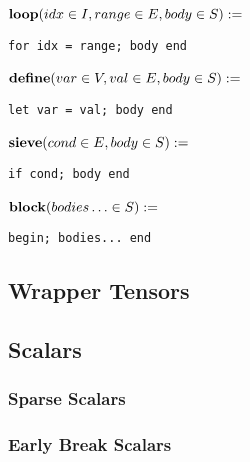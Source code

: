\noindent\begin{minipage}{.5\linewidth}
\raggedleft $\text{\textbf{loop}}(idx \in I, range \in E, body \in S) :=$~
\end{minipage}%
\begin{minipage}{.5\linewidth}
\begin{verbatim}
for idx = range; body end
\end{verbatim}
\end{minipage}

\noindent\begin{minipage}{.5\linewidth}
\raggedleft $\text{\textbf{define}}(var \in V, val \in E, body \in S) :=$~
\end{minipage}%
\begin{minipage}{.5\linewidth}
\begin{verbatim}
let var = val; body end
\end{verbatim}
\end{minipage}

\noindent\begin{minipage}{.5\linewidth}
\raggedleft $\text{\textbf{sieve}}(cond \in E, body \in S) :=$~
\end{minipage}%
\begin{minipage}{.5\linewidth}
\begin{verbatim}
if cond; body end
\end{verbatim}
\end{minipage}

\noindent\begin{minipage}{.5\linewidth}
\raggedleft $\text{\textbf{block}}(bodies\ldots \in S) :=$~
\end{minipage}%
\begin{minipage}{.5\linewidth}
\begin{verbatim}
begin; bodies... end
\end{verbatim}
\end{minipage}


\subsection{Wrapper Tensors}

\subsection{Scalars}

\subsubsection{Sparse Scalars}
\subsubsection{Early Break Scalars}

